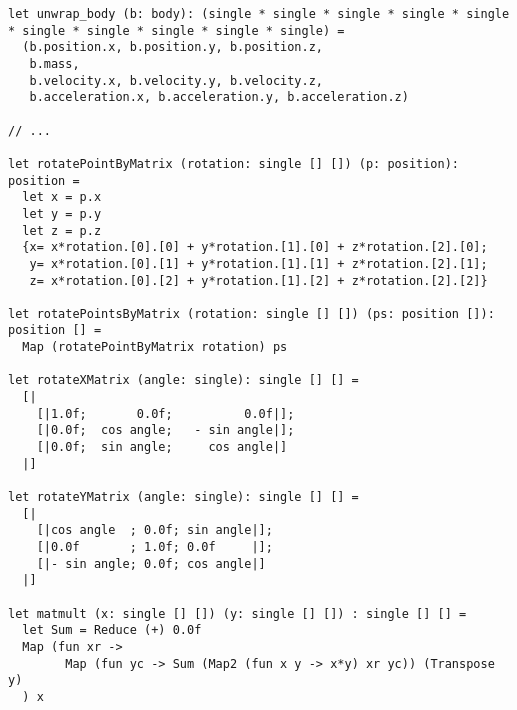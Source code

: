 \begin{verbatim}
let unwrap_body (b: body): (single * single * single * single * single * single * single * single * single * single) =
  (b.position.x, b.position.y, b.position.z,
   b.mass,
   b.velocity.x, b.velocity.y, b.velocity.z,
   b.acceleration.x, b.acceleration.y, b.acceleration.z)

// ...

let rotatePointByMatrix (rotation: single [] []) (p: position): position =
  let x = p.x
  let y = p.y
  let z = p.z
  {x= x*rotation.[0].[0] + y*rotation.[1].[0] + z*rotation.[2].[0];
   y= x*rotation.[0].[1] + y*rotation.[1].[1] + z*rotation.[2].[1];
   z= x*rotation.[0].[2] + y*rotation.[1].[2] + z*rotation.[2].[2]}

let rotatePointsByMatrix (rotation: single [] []) (ps: position []): position [] =
  Map (rotatePointByMatrix rotation) ps

let rotateXMatrix (angle: single): single [] [] =
  [|
    [|1.0f;       0.0f;          0.0f|];
    [|0.0f;  cos angle;   - sin angle|];
    [|0.0f;  sin angle;     cos angle|]
  |]

let rotateYMatrix (angle: single): single [] [] =
  [|
    [|cos angle  ; 0.0f; sin angle|];
    [|0.0f       ; 1.0f; 0.0f     |];
    [|- sin angle; 0.0f; cos angle|]
  |]

let matmult (x: single [] []) (y: single [] []) : single [] [] =
  let Sum = Reduce (+) 0.0f
  Map (fun xr ->
        Map (fun yc -> Sum (Map2 (fun x y -> x*y) xr yc)) (Transpose y)
  ) x
\end{verbatim}

